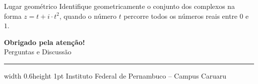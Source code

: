 \documentclass[10pt, aspectratio=169]{beamer}
\begin{document}
\begin{frame}[t] 
  \begin{exampleblock}{Lugar geométrico}
  Identifique geometricamente o conjunto dos complexos na forma $z=t+i\cdot t^2$, quando o número $t$ percorre todos os números reais entre $0$ e $1$.
  \end{exampleblock}  
\end{frame}


\begin{frame}
  \centering
  \vspace{1cm}
  {\Huge \bfseries \color{primary} Obrigado pela atenção!} \\[0.5cm]
  {\large Perguntas e Discussão} \\[1cm]
  \hrule width 0.6\paperwidth height 1pt
  \vspace{0.5cm}
  {\small \sffamily \color{gray} Instituto Federal de Pernambuco -- Campus Caruaru}
\end{frame}
\end{document}
